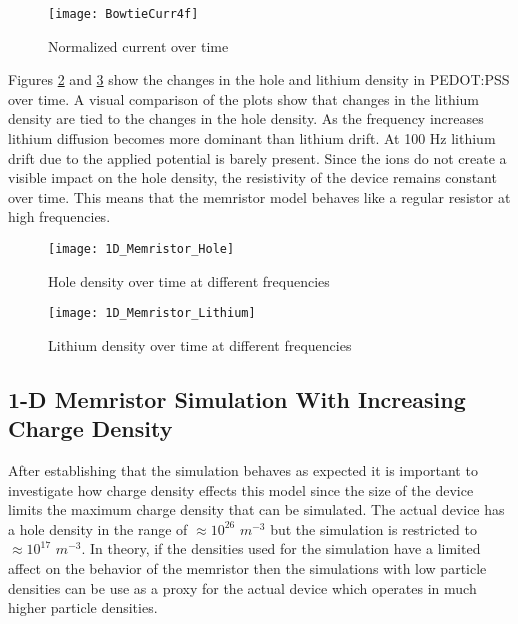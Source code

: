 \begin{doublespace}
\begin{figure}[!htp]
\centering
\texttt{[image: BowtieCurr4f]}
\caption{Normalized current over time} 
\label{BowtieCurr}
\end{figure}

Figures \ref{Bowhole} and \ref{Bowli} show the changes in the hole and lithium density in PEDOT:PSS over time. A visual comparison of the plots show that changes in the lithium density are tied to the changes in the hole density. As the frequency increases lithium diffusion becomes more dominant than lithium drift. At 100 Hz lithium drift due to the applied potential is barely present. Since the ions do not create a visible impact on the hole density, the resistivity of the device remains constant over time. This means that the memristor model behaves like a regular resistor at high frequencies.


\begin{figure}[!htp]
\centering
\texttt{[image: 1D\_Memristor\_Hole]}
\caption{Hole density over time at different frequencies} 
\label{Bowhole}
\end{figure}

\begin{figure}[!htp]
\centering
\texttt{[image: 1D\_Memristor\_Lithium]}
\caption{Lithium density over time at different frequencies} 
\label{Bowli}
\end{figure}


\clearpage
\subsection{1-D Memristor Simulation With Increasing Charge Density}

After establishing that the simulation behaves as expected it is important to investigate how charge density effects this model since the size of the device limits the maximum charge density that can be simulated. The actual device has a hole density in the range of $ \approx 10^{26}$ $m^{-3}$ but the simulation is restricted to $\approx 10^{17}$ $m^{-3}$. In theory, if the densities used for the simulation  have a limited affect on the behavior of the memristor then the simulations with low particle densities can be use as a proxy for the actual device which operates in much higher particle densities.


\end{doublespace}
